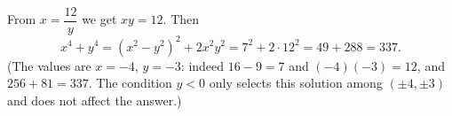 From $x=\dfrac{12}{y}$ we get $xy=12$. Then
\[
x^4+y^4=(x^2-y^2)^2+2x^2y^2=7^2+2\cdot12^2=49+288=\boxed{337}.
\]
(The values are $x=-4$, $y=-3$: indeed $16-9=7$ and $(-4)(-3)=12$, and $256+81=337$. The condition $y<0$ only selects this solution among $(\pm4,\pm3)$ and does not affect the answer.)
